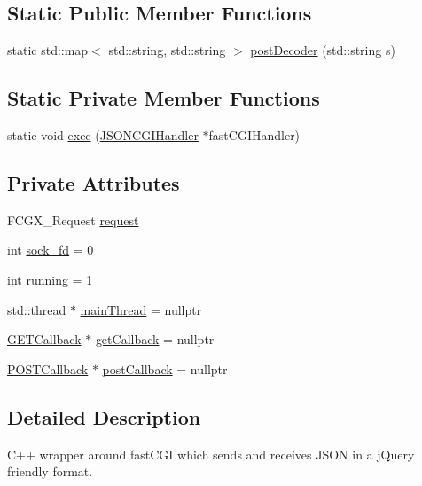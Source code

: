 \subsection*{Static Public Member Functions}
\begin{DoxyCompactItemize}
\item 
static std\+::map$<$ std\+::string, std\+::string $>$ \hyperlink{classJSONCGIHandler_a0f208af3dd050ed182967fe9cca42d78}{post\+Decoder} (std\+::string s)
\end{DoxyCompactItemize}
\subsection*{Static Private Member Functions}
\begin{DoxyCompactItemize}
\item 
static void \hyperlink{classJSONCGIHandler_a42518cd5ad781476d299b50e4c4c0000}{exec} (\hyperlink{classJSONCGIHandler}{J\+S\+O\+N\+C\+G\+I\+Handler} $\ast$fast\+C\+G\+I\+Handler)
\end{DoxyCompactItemize}
\subsection*{Private Attributes}
\begin{DoxyCompactItemize}
\item 
F\+C\+G\+X\+\_\+\+Request \hyperlink{classJSONCGIHandler_a69dba19ef64e913fc7e969854be997c9}{request}
\item 
int \hyperlink{classJSONCGIHandler_a6f696ff6856f32b3ba75a130fcbb8987}{sock\+\_\+fd} = 0
\item 
int \hyperlink{classJSONCGIHandler_aefa19cd01b387693ef99c5aa0c5fc093}{running} = 1
\item 
std\+::thread $\ast$ \hyperlink{classJSONCGIHandler_aca513f708ae4dc76ba70196ff25da695}{main\+Thread} = nullptr
\item 
\hyperlink{classJSONCGIHandler_1_1GETCallback}{G\+E\+T\+Callback} $\ast$ \hyperlink{classJSONCGIHandler_a7c8b4a44e15ac57fe93b382e86899fa7}{get\+Callback} = nullptr
\item 
\hyperlink{classJSONCGIHandler_1_1POSTCallback}{P\+O\+S\+T\+Callback} $\ast$ \hyperlink{classJSONCGIHandler_a09ee0f555db808d07c9ee9a575780553}{post\+Callback} = nullptr
\end{DoxyCompactItemize}


\subsection{Detailed Description}
C++ wrapper around fast\+C\+GI which sends and receives J\+S\+ON in a j\+Query friendly format.

